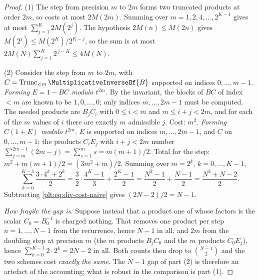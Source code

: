 \documentclass[11pt,oneside]{article}
\theoremstyle{plain}
\theoremstyle{definition}
\theoremstyle{remark}
\newcommand{\Trunc}[2]{\operatorname{Trunc}_{<#2}#1}     %
\newcommand{\recip}[1]{\MultiplicativeInverseOf{#1}}
\begin{document}
\begin{proof}
(1)  The step from precision \(m\) to \(2m\) forms two truncated products at
order \(2m\), so costs at most \(2M(2m)\).  Summing over
\(m=1,2,4,\dots,2^{K-1}\) gives at most \(\sum_{j=1}^{K}2M(2^{j})\).  The
hypothesis \(2M(n)\le M(2n)\) gives \(M(2^{j})\le M(2^{K})/2^{K-j}\), so the
sum is at most \(2M(N)\sum_{j=1}^{K}2^{\,j-K}\le4M(N)\).

(2)  Consider the step from \(m\) to \(2m\), with \(C=\Trunc{\recip{B}}{m}\)
supported on indices \(0,\dots,m-1\).
\emph{Forming \(E=1-BC\) modulo \(t^{2m}\).}  By the invariant, the blocks of
\(BC\) of index \(<m\) are known to be \(1,0,\dots,0\); only indices
\(m,\dots,2m-1\) must be computed.  The needed products are \(B_{j}C_{i}\) with
\(0\le i<m\) and \(m\le i+j<2m\), and for each of the \(m\) values of \(i\)
there are exactly \(m\) admissible \(j\).  Cost: \(m^{2}\).
\emph{Forming \(C(1+E)\) modulo \(t^{2m}\).}  \(E\) is supported on indices
\(m,\dots,2m-1\), and \(C\) on \(0,\dots,m-1\); the products \(C_{i}E_{j}\)
with \(i+j<2m\) number \(\sum_{j=m}^{2m-1}(2m-j)=\sum_{s=1}^{m}s=m(m+1)/2\).
Total for the step: \(m^{2}+m(m+1)/2=(3m^{2}+m)/2\).  Summing over
\(m=2^{k}\), \(k=0,\dots,K-1\),
\[
  \sum_{k=0}^{K-1}\frac{3\cdot4^{k}+2^{k}}{2}
  =\frac{3}{2}\cdot\frac{4^{K}-1}{3}+\frac{2^{K}-1}{2}
  =\frac{N^{2}-1}{2}+\frac{N-1}{2}
  =\frac{N^{2}+N-2}{2}.
\]
Subtracting \cref{plt:eq:div-cost-naive} gives \((2N-2)/2=N-1\).

\emph{How fragile the gap is.}  Suppose instead that a product one of whose
factors is the scalar \(C_{0}=B_{0}^{-1}\) is charged nothing.  That removes
one product per step \(n=1,\dots,N-1\) from the recurrence, hence \(N-1\) in
all, and \(2m\) from the doubling step at precision \(m\) (the \(m\) products
\(B_{j}C_{0}\) and the \(m\) products \(C_{0}E_{j}\)), hence
\(\sum_{k=0}^{K-1}2\cdot2^{k}=2N-2\) in all.  Both counts then drop to
\(\binom{N-1}{2}\) and the two schemes cost \emph{exactly the same}.  The
\(N-1\) gap of part (2) is therefore an artefact of the accounting; what is
robust in the comparison is part (1).
\end{proof}
\end{document}
